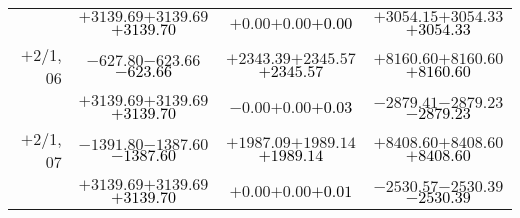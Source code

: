 \documentclass[compress]{beamer}
\begin{document}
\begin{frame}
{\begin{tabular}{r | c | c | c}
           & $+3139.69$\hspace{0.1 cm}$+3139.69$\hspace{0.1 cm}\textcolor{black}{$+3139.70$} & $+0.00$\hspace{0.1 cm}$+0.00$\hspace{0.1 cm}\textcolor{black}{$+0.00$} & $+3054.15$\hspace{0.1 cm}$+3054.33$\hspace{0.1 cm}\textcolor{black}{$+3054.33$} \\
$+$2/1, 06 & $-627.80$\hspace{0.1 cm}$-623.66$\hspace{0.1 cm}\textcolor{black}{$-623.66$} & $+2343.39$\hspace{0.1 cm}$+2345.57$\hspace{0.1 cm}\textcolor{black}{$+2345.57$} & $+8160.60$\hspace{0.1 cm}$+8160.60$\hspace{0.1 cm}\textcolor{black}{$+8160.60$} \\
           & $+3139.69$\hspace{0.1 cm}$+3139.69$\hspace{0.1 cm}\textcolor{black}{$+3139.70$} & $-0.00$\hspace{0.1 cm}$+0.00$\hspace{0.1 cm}\textcolor{black}{$+0.03$} & $-2879.41$\hspace{0.1 cm}$-2879.23$\hspace{0.1 cm}\textcolor{black}{$-2879.23$} \\
$+$2/1, 07 & $-1391.80$\hspace{0.1 cm}$-1387.60$\hspace{0.1 cm}\textcolor{black}{$-1387.60$} & $+1987.09$\hspace{0.1 cm}$+1989.14$\hspace{0.1 cm}\textcolor{black}{$+1989.14$} & $+8408.60$\hspace{0.1 cm}$+8408.60$\hspace{0.1 cm}\textcolor{black}{$+8408.60$} \\
           & $+3139.69$\hspace{0.1 cm}$+3139.69$\hspace{0.1 cm}\textcolor{black}{$+3139.70$} & $+0.00$\hspace{0.1 cm}$+0.00$\hspace{0.1 cm}\textcolor{black}{$+0.01$} & $-2530.57$\hspace{0.1 cm}$-2530.39$\hspace{0.1 cm}\textcolor{black}{$-2530.39$} \\

\end{tabular}}
\end{frame}
\end{document}
